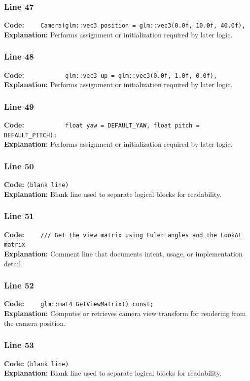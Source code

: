 \documentclass[11pt,a4paper]{article}
\begin{document}
\subsubsection*{Line 47}
\textbf{Code:} \verb|    Camera(glm::vec3 position = glm::vec3(0.0f, 10.0f, 40.0f),|\\
\textbf{Explanation:} Performs assignment or initialization required by later logic.

\subsubsection*{Line 48}
\textbf{Code:} \verb|           glm::vec3 up = glm::vec3(0.0f, 1.0f, 0.0f),|\\
\textbf{Explanation:} Performs assignment or initialization required by later logic.

\subsubsection*{Line 49}
\textbf{Code:} \verb|           float yaw = DEFAULT_YAW, float pitch = DEFAULT_PITCH);|\\
\textbf{Explanation:} Performs assignment or initialization required by later logic.

\subsubsection*{Line 50}
\textbf{Code:} \texttt{(blank line)}\\
\textbf{Explanation:} Blank line used to separate logical blocks for readability.

\subsubsection*{Line 51}
\textbf{Code:} \verb|    /// Get the view matrix using Euler angles and the LookAt matrix|\\
\textbf{Explanation:} Comment line that documents intent, usage, or implementation detail.

\subsubsection*{Line 52}
\textbf{Code:} \verb|    glm::mat4 GetViewMatrix() const;|\\
\textbf{Explanation:} Computes or retrieves camera view transform for rendering from the camera position.

\subsubsection*{Line 53}
\textbf{Code:} \texttt{(blank line)}\\
\textbf{Explanation:} Blank line used to separate logical blocks for readability.
\end{document}
